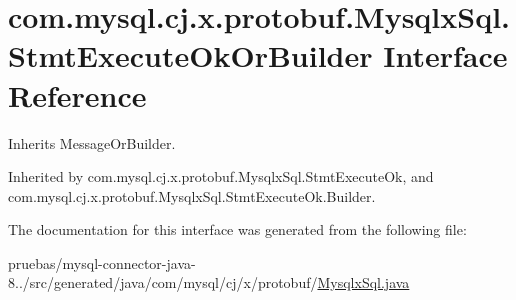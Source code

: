 \hypertarget{interfacecom_1_1mysql_1_1cj_1_1x_1_1protobuf_1_1_mysqlx_sql_1_1_stmt_execute_ok_or_builder}{}\section{com.\+mysql.\+cj.\+x.\+protobuf.\+Mysqlx\+Sql.\+Stmt\+Execute\+Ok\+Or\+Builder Interface Reference}
\label{interfacecom_1_1mysql_1_1cj_1_1x_1_1protobuf_1_1_mysqlx_sql_1_1_stmt_execute_ok_or_builder}


Inherits Message\+Or\+Builder.



Inherited by com.\+mysql.\+cj.\+x.\+protobuf.\+Mysqlx\+Sql.\+Stmt\+Execute\+Ok, and com.\+mysql.\+cj.\+x.\+protobuf.\+Mysqlx\+Sql.\+Stmt\+Execute\+Ok.\+Builder.



The documentation for this interface was generated from the following file\+:\begin{DoxyCompactItemize}
\item 
pruebas/mysql-\/connector-\/java-\/8../src/generated/java/com/mysql/cj/x/protobuf/\mbox{\hyperlink{_mysqlx_sql_8java}{Mysqlx\+Sql.\+java}}\end{DoxyCompactItemize}
